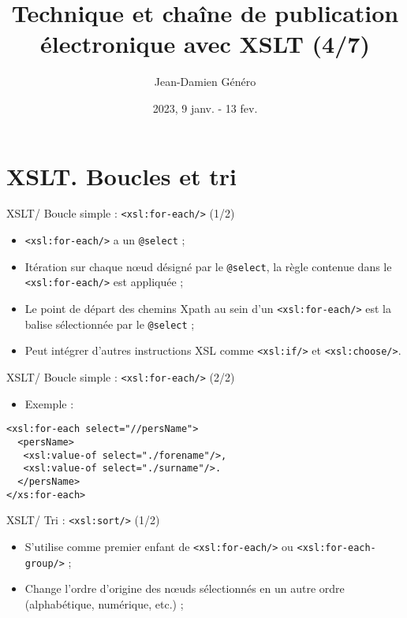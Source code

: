 \documentclass{beamer}
\title{Technique et chaîne de publication électronique avec XSLT (4/7)}
\date{2023, 9 janv. - 13 fev.}
\author{Jean-Damien Généro}
\institute{École nationale des chartes -- M2 TNAH}
\begin{document}
    \maketitle

    \section{XSLT. Boucles et tri}

    \begin{frame}{XSLT/ Boucle simple : \texttt{<xsl:for-each/>} (1/2)}
        \Large
        \begin{itemize}
            \item \texttt{<xsl:for-each/>} a un \texttt{@select} ;
            \bigskip
            \item Itération sur chaque n\oe ud désigné par le \texttt{@select}, la règle contenue dans le \texttt{<xsl:for-each/>} est appliquée ;
            \bigskip
            \item Le point de départ des chemins Xpath au sein d'un \texttt{<xsl:for-each/>} est la balise sélectionnée par le \texttt{@select} ;
            \bigskip
            \item Peut intégrer d'autres instructions XSL comme \texttt{<xsl:if/>} et \texttt{<xsl:choose/>}.
        \end{itemize}
    \end{frame}

    \begin{frame}[fragile]{XSLT/ Boucle simple : \texttt{<xsl:for-each/>} (2/2)}
        \Large
        \begin{itemize}
            \item Exemple :
        \end{itemize}
        \begin{verbatim}
<xsl:for-each select="//persName">
  <persName>
   <xsl:value-of select="./forename"/>,
   <xsl:value-of select="./surname"/>.
  </persName>
</xs:for-each>
        \end{verbatim}
    \end{frame}

    \begin{frame}{XSLT/ Tri : \texttt{<xsl:sort/>} (1/2)}
        \Large
        \begin{itemize}
            \item S'utilise comme premier enfant de \texttt{<xsl:for-each/>} ou \texttt{<xsl:for-each-group/>} ;
            \bigskip
            \item Change l'ordre d'origine des n\oe uds sélectionnés en un autre ordre (alphabétique, numérique, etc.) ;
        \end{itemize}
    \end{frame}
\end{document}
